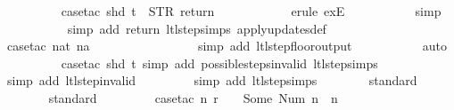 \begin{isabellebody}
\ \ \ \ \ \ \ \ \isamarkupfalse%
\ {\isacharparenleft}case{\isacharunderscore}tac\ {\isachardoublequoteopen}shd\ t\ {\isacharequal}\ {\isacharparenleft}STR\ {\isacharprime}{\isacharprime}return{\isacharprime}{\isacharprime}{\isacharcomma}\ {\isacharbrackleft}{\isacharbrackright}{\isacharparenright}{\isachardoublequoteclose}{\isacharparenright}\isanewline
\ \ \ \ \ \ \ \ \ \isamarkupfalse%
\ {\isacharparenleft}erule\ exE{\isacharparenright}\isanewline
\ \ \ \ \ \ \ \ \ \isamarkupfalse%
\ simp\isanewline
\ \ \ \ \ \ \ \ \ \isamarkupfalse%
\ {\isacharparenleft}simp\ add{\isacharcolon}\ return\ ltl{\isacharunderscore}step{\isachardot}simps\ apply{\isacharunderscore}updates{\isacharunderscore}def{\isacharparenright}\isanewline
\ \ \ \ \ \ \ \ \ \isamarkupfalse%
\ {\isacharparenleft}case{\isacharunderscore}tac\ {\isachardoublequoteopen}nat\ na\ {\isasymin}\ {\isacharbraceleft}{}{\isacharcomma}\ {}{\isacharcomma}\ {}{\isacharcomma}\ {}{\isacharbraceright}{\isachardoublequoteclose}{\isacharparenright}\isanewline
\ \ \ \ \ \ \ \ \ \ \isamarkupfalse%
\ {\isacharparenleft}simp\ add{\isacharcolon}\ ltl{\isacharunderscore}step{\isacharunderscore}floor{\isacharunderscore}output{\isacharparenright}\isanewline
\ \ \ \ \ \ \ \ \ \isamarkupfalse%
\ auto{\isacharbrackleft}{}{\isacharbrackright}\isanewline
\ \ \ \ \ \ \ \ \isamarkupfalse%
\ {\isacharparenleft}case{\isacharunderscore}tac\ {\isachardoublequoteopen}shd\ t{\isachardoublequoteclose}{\isacharcomma}\ simp\ add{\isacharcolon}\ possible{\isacharunderscore}steps{\isacharunderscore}{}{\isacharunderscore}invalid\ ltl{\isacharunderscore}step{\isachardot}simps{\isacharparenright}\isanewline
\ \ \ \ \ \ \ \isamarkupfalse%
\ {\isacharparenleft}simp\ add{\isacharcolon}\ ltl{\isacharunderscore}step{\isacharunderscore}{}{\isacharunderscore}invalid{\isacharparenright}\isanewline
\ \ \ \ \ \ \ \isamarkupfalse%
\ {\isacharparenleft}simp\ add{\isacharcolon}\ ltl{\isacharunderscore}step{\isachardot}simps{\isacharparenright}\isanewline
\ \ \ \ \ \ \isamarkupfalse%
\ standard\isanewline
\ \ \ \ \ \ \isamarkupfalse%
\ standard\isanewline
\isanewline
\ \ \ \ \ \ \ \isamarkupfalse%
\ {\isacharparenleft}case{\isacharunderscore}tac\ {\isachardoublequoteopen}{\isasymexists}n{\isachardot}\ r\ {\isachardollar}\ {}\ {\isacharequal}\ Some\ {\isacharparenleft}Num\ n{\isacharparenright}\ {\isasymand}\ n\ {\isasymin}\ {\isacharbraceleft}{}{\isacharcomma}\ {}{\isacharcomma}\ {}{\isacharcomma}\ {}{\isacharbraceright}{\isachardoublequoteclose}{\isacharparenright}\isanewline

\end{isabellebody}
